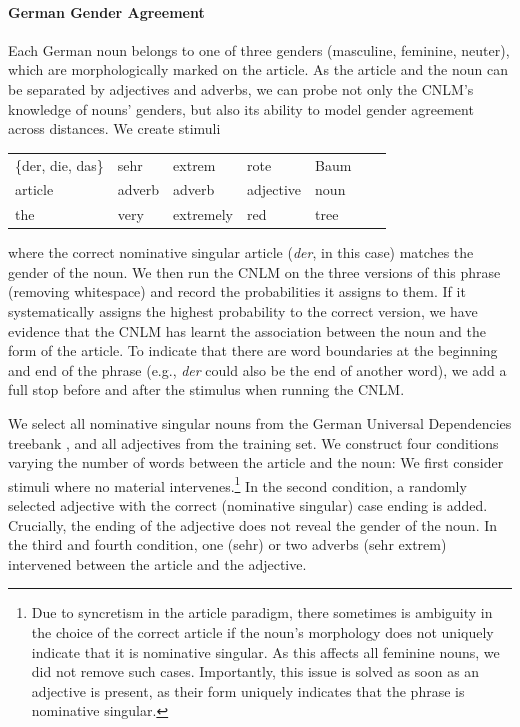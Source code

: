 \paragraph{German Gender Agreement}
Each German noun belongs to one of three genders (masculine, feminine, neuter), which are morphologically marked on the article.
As the article and the noun can be separated by adjectives and adverbs, we can probe not only the CNLM's knowledge of nouns' genders, but also its ability to model gender agreement across distances.
We create stimuli
\begin{tabular}{lllllll}
	\{der, die, das\}& sehr& extrem& rote& Baum \\
	article & adverb & adverb & adjective & noun \\
	the & very & extremely & red & tree
\end{tabular}
where the correct nominative singular article (\emph{der}, in this case) matches the gender of the noun.
We then run the CNLM on the three versions of this phrase (removing whitespace) and record the probabilities it assigns to them.
If it systematically assigns the highest probability to the correct version, we have evidence that the CNLM has learnt the association between the noun and the form of the article.
To indicate that there are word boundaries at the beginning and end of the phrase (e.g., \emph{der} could also be the end of another word), we add a full stop before and after the stimulus when running the CNLM.


We select all nominative singular nouns from the German Universal Dependencies treebank \cite{de2006generating,mcdonald2013universal}, and all adjectives from the training set.
We construct four conditions varying the number of words between the article and the noun:
We first consider stimuli where no material intervenes.\footnote{Due to syncretism in the article paradigm, there sometimes is ambiguity in the choice of the correct article if the noun's morphology does not uniquely indicate that it is nominative singular. As this affects all feminine nouns, we did not remove such cases. Importantly, this issue is solved as soon as an adjective is present, as their form uniquely indicates that the phrase is nominative singular.}
In the second condition, a randomly selected adjective with the correct (nominative singular) case ending is added.
Crucially, the ending of the adjective does not reveal the gender of the noun.
In the third and fourth condition, one (sehr) or two adverbs (sehr extrem) intervened between the article and the adjective.

